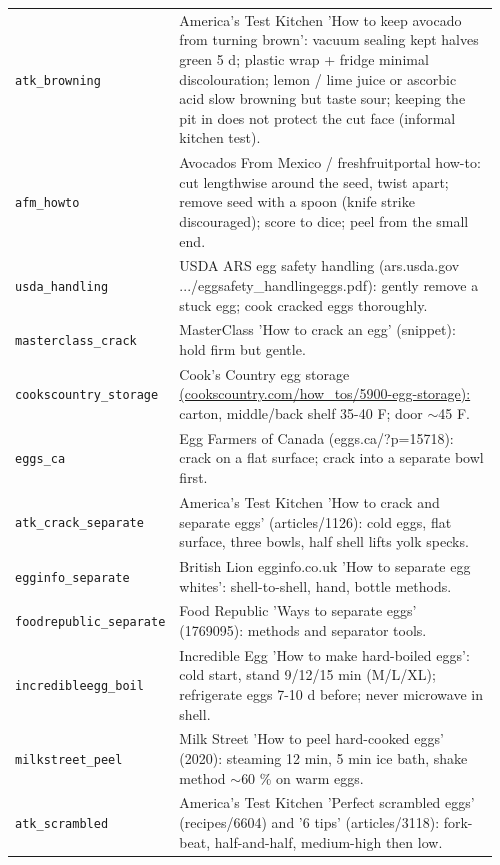 \documentclass[10.5pt,a4paper]{article}
\begin{document}
{\begin{longtable}{@{}p{0.16\linewidth}p{0.8\linewidth}@{}}
\texttt{atk\_\allowbreak{}browning} & America's Test Kitchen 'How to keep avocado from turning brown': vacuum sealing kept halves green 5 d; plastic wrap + fridge minimal discolouration; lemon / lime juice or ascorbic acid slow browning but taste sour; keeping the pit in does not protect the cut face (informal kitchen test). \\
\texttt{afm\_\allowbreak{}howto} & Avocados From Mexico / freshfruitportal how-to: cut lengthwise around the seed, twist apart; remove seed with a spoon (knife strike discouraged); score to dice; peel from the small end. \\
\texttt{usda\_\allowbreak{}handling} & USDA ARS egg safety handling (ars.usda.gov .../eggsafety\_handlingeggs.pdf): gently remove a stuck egg; cook cracked eggs thoroughly. \\
\texttt{masterclass\_\allowbreak{}crack} & MasterClass 'How to crack an egg' (snippet): hold firm but gentle. \\
\texttt{cookscountry\_\allowbreak{}storage} & Cook's Country egg storage \url{(cookscountry.com/how_tos/5900-egg-storage):} carton, middle/back shelf 35-40 F; door $\sim$45 F. \\
\texttt{eggs\_\allowbreak{}ca} & Egg Farmers of Canada (eggs.ca/?p=15718): crack on a flat surface; crack into a separate bowl first. \\
\texttt{atk\_\allowbreak{}crack\_\allowbreak{}separate} & America's Test Kitchen 'How to crack and separate eggs' (articles/1126): cold eggs, flat surface, three bowls, half shell lifts yolk specks. \\
\texttt{egginfo\_\allowbreak{}separate} & British Lion egginfo.co.uk 'How to separate egg whites': shell-to-shell, hand, bottle methods. \\
\texttt{foodrepublic\_\allowbreak{}separate} & Food Republic 'Ways to separate eggs' (1769095): methods and separator tools. \\
\texttt{incredibleegg\_\allowbreak{}boil} & Incredible Egg 'How to make hard-boiled eggs': cold start, stand 9/12/15 min (M/L/XL); refrigerate eggs 7-10 d before; never microwave in shell. \\
\texttt{milkstreet\_\allowbreak{}peel} & Milk Street 'How to peel hard-cooked eggs' (2020): steaming 12 min, 5 min ice bath, shake method $\sim$60 \% on warm eggs. \\
\texttt{atk\_\allowbreak{}scrambled} & America's Test Kitchen 'Perfect scrambled eggs' (recipes/6604) and '6 tips' (articles/3118): fork-beat, half-and-half, medium-high then low. \\

\end{longtable}}
\end{document}
